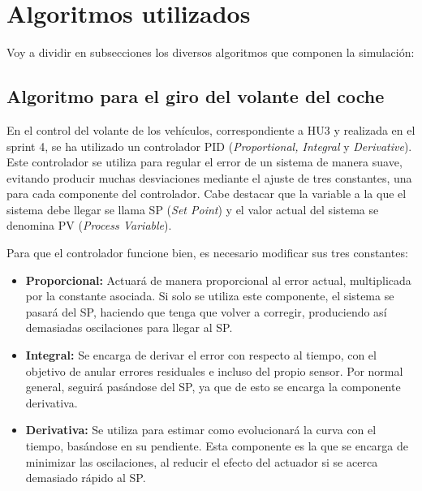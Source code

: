 \newpage

\section{Algoritmos utilizados}

Voy a dividir en subsecciones los diversos algoritmos que componen la simulación:

\subsection{Algoritmo para el giro del volante del coche}
\label{sec:pid-sec}

En el control del volante de los vehículos, correspondiente a HU3 y realizada en el sprint 4, se ha utilizado un controlador PID (\textit{Proportional, Integral} y \textit{Derivative}). Este controlador se utiliza para regular el error de un sistema de manera suave, evitando producir muchas desviaciones mediante el ajuste de tres constantes, una para cada componente del controlador. Cabe destacar que la variable a la que el sistema debe llegar se llama SP (\textit{Set Point}) y el valor actual del sistema se denomina PV (\textit{Process Variable}). 

\bigskip

Para que el controlador funcione bien, es necesario modificar sus tres constantes: 

\begin{itemize}
    \item \textbf{Proporcional: }Actuará de manera proporcional al error actual, multiplicada por la constante asociada. Si solo se utiliza este componente, el sistema se pasará del SP, haciendo que tenga que volver a corregir, produciendo así demasiadas oscilaciones para llegar al SP. 

    \item \textbf{Integral: }Se encarga de derivar el error con respecto al tiempo, con el objetivo de anular errores residuales e incluso del propio sensor. Por normal general, seguirá pasándose del SP, ya que de esto se encarga la componente derivativa.

    \item \textbf{Derivativa: }Se utiliza para estimar como evolucionará la curva con el tiempo, basándose en su pendiente. Esta componente es la que se encarga de minimizar las oscilaciones, al reducir el efecto del actuador si se acerca demasiado rápido al SP.
\end{itemize}

